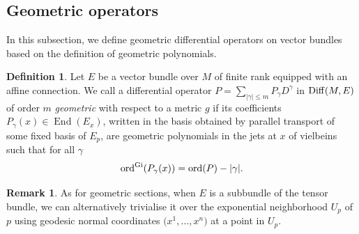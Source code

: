 \documentclass[10pt,a4paper]{amsart}
\numberwithin{equation}{section}
\theoremstyle{definition}
\newtheorem{rk}[thm]{Remark}
\newtheorem{defn}[thm]{Definition}
\begin{document}
\subsection{Geometric operators} In this subsection, we define geometric differential operators on vector bundles based on the definition of geometric polynomials.

\begin{defn}\label{defn:geometricdiffop}
 Let $E$ be a vector bundle over $M$ of finite rank equipped with an affine connection. We call a differential operator $P= \sum_{\vert \gamma\vert \leq m} P_\gamma D^\gamma$ in $ {\rm Diff}(M, E)$ of order $m$ {\it geometric} with respect to a metric $g$ if its coefficients
 $P_\gamma (x) \in \operatorname{End}(E_x)$, written in the basis obtained by parallel transport of some fixed basis of $E_p$, are geometric polynomials in the jets at $x$ of vielbeins such that for all $\gamma$
\begin{equation}\label{eq:geomopGi}
		{\rm ord}^{\rm Gi}(P_\gamma(x))={\rm ord}(P)- |\gamma|.
\end{equation}
\end{defn}
\begin{rk} As for geometric sections, when $E$ is a subbundle of the tensor bundle, we can alternatively trivialise it over the exponential neighborhood $U_p$ of $p$ using geodesic normal coordinates $\bigl(x^1, \dots, x^n\bigr)$ at a point in $U_p$.
\end{rk}
\end{document}
